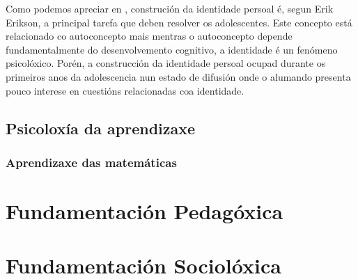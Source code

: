 Como podemos apreciar en \cite{coll1990desarrollo}, construción da identidade persoal é, segun Erik Erikson, a principal tarefa que deben resolver os adolescentes. Este concepto está relacionado co autoconcepto mais mentras o autoconcepto depende fundamentalmente do desenvolvemento cognitivo, a identidade é un fenómeno psicolóxico. Porén, a construcción da identidade persoal ocupad durante os primeiros anos da adolescencia nun estado de difusión onde o alumando presenta pouco interese en cuestións relacionadas coa identidade.

\subsection{Psicoloxía da aprendizaxe}


\subsubsection{Aprendizaxe das matemáticas}



\section{Fundamentación Pedagóxica}


\section{Fundamentación Sociolóxica}
